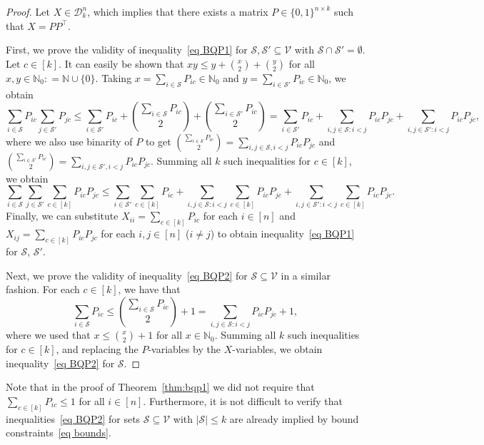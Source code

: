 \documentclass[11pt, a4paper]{article}
\newcommand{\eqdef}{\mathrel{\mathop:}=}
\newcommand{\mc}{\mathcal}
\begin{document}
\begin{proof}
    Let $X \in \mc{D}^n_k$, which implies that there exists a matrix $P \in \{0,1\}^{n \times k}$ such that $X = PP^\top$. 
    
    First, we prove the validity of inequality~\eqref{eq BQP1} for $\mc{S}, \mc{S}' \subseteq \mc{V}$ with $\mc{S} \cap \mc{S}' = \emptyset$.
    Let $c \in [k]$. 
    It can easily be shown that $xy \leq y + \binom{x}{2} +
    \binom{y}{2}$ for all $x, y \in \mathbb{N}_0 {\eqdef \mathbb{N} \cup \{0\}}$. 
    Taking $x = \sum_{i \in \mc{S}} P_{ic} \in \mathbb{N}_0$ and $y = \sum_{i \in \mc{S}'} P_{ic} \in \mathbb{N}_0$, we obtain 
    $$\sum_{i \in \mc{S}} P_{ic} \sum_{j \in \mc{S}'} P_{jc} \leq \sum_{i \in \mc{S}'} P_{ic} + \binom{\sum_{i \in \mc{S}} P_{ic}}{2} + \binom{\sum_{i \in \mc{S}'} P_{ic}}{2} = \sum_{i \in \mc{S}'} P_{ic} + \sum_{i,j \in \mc{S}: i < j} P_{ic}P_{jc} + \sum_{i,j \in \mc{S}': i < j} P_{ic}P_{jc},$$
    where we also use binarity of $P$ to get $\binom{\sum_{i \in \mc{S}} P_{ic}}{2} = \sum_{i,j \in \mc{S}, i < j} P_{ic} P_{jc}$ and $\binom{\sum_{i \in \mc{S}'} P_{ic}}{2} = \sum_{i,j \in \mc{S}', i < j} P_{ic} P_{jc}$.
    Summing all $k$ such inequalities for $c \in [k]$, we obtain 
    $$\sum_{i \in \mc{S}} \sum_{j \in \mc{S}'} \sum_{c \in [k]} P_{ic}P_{jc} \leq  \sum_{i \in \mc{S}'}\sum_{c \in [k]} P_{ic} + \sum_{i,j \in \mc{S}: i < j} \sum_{c \in [k]} P_{ic}P_{jc} + \sum_{i,j \in \mc{S}': i < j} \sum_{c \in [k]} P_{ic}P_{jc}.$$ 
    Finally, we can substitute $X_{ii} = \sum_{c \in [k]} P_{ic}$ for each $i \in [n]$ and $X_{ij} = \sum_{c \in [k]} P_{ic}P_{jc}$ for each $i, j \in [n]$ ($i \neq j$) to obtain inequality~\eqref{eq BQP1} for $\mc{S}$, $\mc{S}'$.  

    Next, we prove the validity of inequality~\eqref{eq BQP2} for $\mc{S} \subseteq \mc{V}$ in a similar fashion.
    For each $c \in [k]$, we have that
    $$\sum_{i \in \mc{S}} P_{ic} \leq \binom{\sum_{i \in \mc{S}} P_{ic}}{2} + 1 = \sum_{i, j \in \mc{S}: i < j} P_{ic} P_{jc} + 1,$$
    where we used that $x \leq \binom{x}{2} + 1$ for all $x \in \mathbb{N}_0$. 
    Summing all $k$ such inequalities for $c \in [k]$, and replacing the $P$-variables by the $X$-variables, we obtain inequality~\eqref{eq BQP2} for $\mc{S}$.
\end{proof}
Note that in the proof of Theorem~\ref{thm:bqp1} we did not require that $\sum_{c \in [k]}P_{ic} \leq 1$ for all $i \in [n]$.
Furthermore, it is not difficult to verify that inequalities~\eqref{eq BQP2} for sets $\mc{S} \subseteq \mc{V}$ with $|\mc{S}| \leq k$ are already implied by bound constraints~\eqref{eq bounds}.
\end{document}
